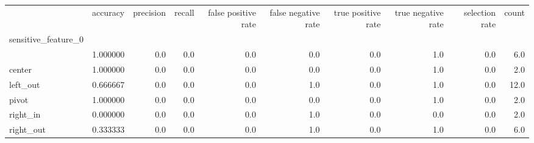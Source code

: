 \begin{tabular}{lrrrrrrrrr}
\toprule
{} &  accuracy &  precision &  recall &  false positive rate &  false negative rate &  true positive rate &  true negative rate &  selection rate &  count \\
sensitive\_feature\_0 &           &            &         &                      &                      &                     &                     &                 &        \\
\midrule
                    &  1.000000 &        0.0 &     0.0 &                  0.0 &                  0.0 &                 0.0 &                 1.0 &             0.0 &    6.0 \\
center              &  1.000000 &        0.0 &     0.0 &                  0.0 &                  0.0 &                 0.0 &                 1.0 &             0.0 &    2.0 \\
left\_out            &  0.666667 &        0.0 &     0.0 &                  0.0 &                  1.0 &                 0.0 &                 1.0 &             0.0 &   12.0 \\
pivot               &  1.000000 &        0.0 &     0.0 &                  0.0 &                  0.0 &                 0.0 &                 1.0 &             0.0 &    2.0 \\
right\_in            &  0.000000 &        0.0 &     0.0 &                  0.0 &                  1.0 &                 0.0 &                 0.0 &             0.0 &    2.0 \\
right\_out           &  0.333333 &        0.0 &     0.0 &                  0.0 &                  1.0 &                 0.0 &                 1.0 &             0.0 &    6.0 \\
\bottomrule
\end{tabular}
